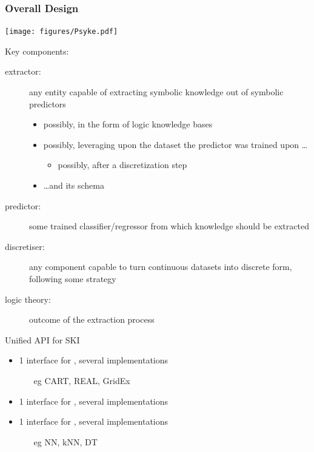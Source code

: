 \documentclass[presentation]{beamer}\mode<presentation>{\usetheme{AMSBolognaFC}}
\begin{document}
\begin{frame}[allowframebreaks]
\frametitle{Overall Design}

    \begin{center}
        \texttt{[image: figures/Psyke.pdf]}
    \end{center}

    \framebreak

    Key components:
    \begin{description}
        \item[extractor:] any entity capable of extracting symbolic knowledge out of symbolic predictors
        \begin{itemize}
            \item possibly, in the form of logic \alert{knowledge bases}
            \item possibly, leveraging upon the \alert{dataset} the predictor was trained upon \ldots
            \begin{itemize}
                \item possibly, after a \alert{discretization} step
            \end{itemize}
            \item \ldots and its \alert{schema}
        \end{itemize}

        \item[predictor:] some trained classifier/regressor from which knowledge should be extracted
        
        \item[discretiser:] any component capable to turn continuous datasets into discrete form, following some strategy
        
        \item[logic theory:] outcome of the extraction process
    \end{description}

    \begin{block}{Unified API for SKI}
        \begin{itemize}
            \item 1 interface for , several implementations
            \begin{itemize}
                \item[eg] CART, REAL, GridEx
            \end{itemize}
            \item 1 interface for , several implementations
            \item 1 interface for , several implementations
            \begin{itemize}
                \item[eg] NN, kNN, DT
            \end{itemize}
        \end{itemize}
    \end{block}
\end{frame}
\end{document}

